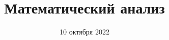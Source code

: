 

\DeclareMathOperator{\Kerr}{Ker}
\DeclareMathOperator{\Imm}{Im}
\DeclareMathOperator{\Int}{Int}
\DeclareMathOperator{\Mat}{Mat}
\DeclareMathOperator{\rank}{rank}
\DeclareMathOperator{\diam}{diam}
\DeclareMathOperator*{\id}{id}
\renewcommand{\phi}{\varphi}
\renewcommand{\theta}{\vartheta}
\renewcommand{\epsilon}{\varepsilon}
\newcommand{\R}{\mathbb{R}}
\renewcommand{\C}{\mathbb{C}}
\newcommand{\Q}{\mathbb{Q}}
\newcommand{\N}{\mathbb{N}}
\setcounter{lemma}{3}
\DeclareMathOperator{\lrhimani}{\underset{\Pi}{\underline{\int}}}
\DeclareMathOperator{\urhimani}{\underset{\Pi}{\overline{\int}}}
\DeclareMathOperator{\rhimani}{\underset{\Pi}{\int}}


    \title{Математический анализ}
    \date{10 октября 2022}
    \maketitle

    \pagebreak

    
